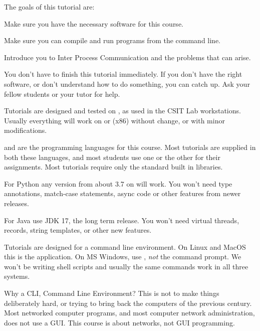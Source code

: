 










The goals of this tutorial are:

\DOT Make sure you have the necessary software for this course.

\DOT Make sure you can compile and run programs from the command line.

\DOT Introduce you to Inter Process Communication and the problems that can arise.

You don't have to finish this tutorial immediately. If you don't have the right
software, or don't understand how to do something, you can catch up. Ask your fellow
students or your tutor for help.



Tutorials are designed and tested on , as used in the CSIT Lab workstations.
Usually everything will work on  or  (x86) without change,
or with minor modifications.

 and  are the  programming languages for this course.
Most tutorials are supplied in both these languages, and most students use one or the
other for their assignments. Most tutorials require only the standard built in libraries.

For Python any version from about 3.7 on will work. You won't need type annotations,
match-case statements, async code or other features from newer releases.

For Java use JDK 17, the long term release. You won't need virtual threads,
records, string templates, or other new features.

Tutorials are designed for a command line environment. On Linux and MacOS this is the
 application. On MS Windows, use , \emph{not} the command
prompt. We won't be writing shell scripts and usually the same commands work in all
three systems.

Why a CLI, Command Line Environment? This is not to make things deliberately hard,
or trying to bring back the computers of the previous century. Most networked computer
programs, and most computer network administration, does not use a GUI. This course is
about networks, not GUI programming.

